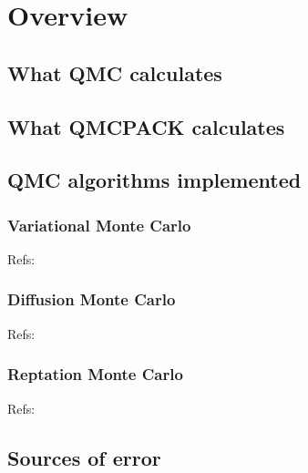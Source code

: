 \chapter{Overview}
\section{What QMC calculates}
\section{What QMCPACK calculates}
\section{QMC algorithms implemented}
\subsection{Variational Monte Carlo}
Refs: \cite{PhysRev.138.A442,PhysRevB.16.3081}
\subsection{Diffusion Monte Carlo}
Refs: \cite{Ceperley1979,Schmidt1984}
\subsection{Reptation Monte Carlo}
Refs: \cite{PhysRevLett.82.4745}
\section{Sources of error}
